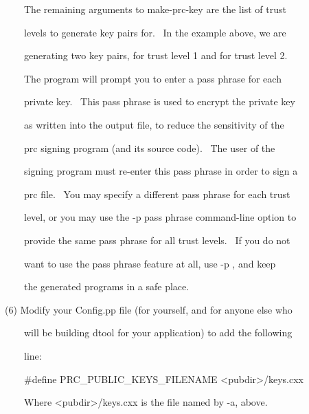 \documentclass[a4paper]{article}
\begin{document}
\bigskip

{\color{black}
\ \ \ \ The remaining arguments to make-prc-key are the list of trust}

{\color{black}
\ \ \ \ levels to generate key pairs for. \ In the example above, we are}

{\color{black}
\ \ \ \ generating two key pairs, for trust level 1 and for trust level 2.}


\bigskip

{\color{black}
\ \ \ \ The program will prompt you to enter a pass phrase for each}

{\color{black}
\ \ \ \ private key. \ This pass phrase is used to encrypt the private key}

{\color{black}
\ \ \ \ as written into the output file, to reduce the sensitivity of the}

{\color{black}
\ \ \ \ prc signing program (and its source code). \ The user of the}

{\color{black}
\ \ \ \ signing program must re-enter this pass phrase in order to sign a}

{\color{black}
\ \ \ \ prc file. \ You may specify a different pass phrase for each trust}

{\color{black}
\ \ \ \ level, or you may use the -p {\textquotedbl}pass phrase{\textquotedbl} command-line option to}

{\color{black}
\ \ \ \ provide the same pass phrase for all trust levels. \ If you do not}

{\color{black}
\ \ \ \ want to use the pass phrase feature at all, use -p {\textquotedbl}{\textquotedbl}, and keep}

{\color{black}
\ \ \ \ the generated programs in a safe place.}

\clearpage
\bigskip


\bigskip

{\color{black}
(6) Modify your Config.pp file (for yourself, and for anyone else who}

{\color{black}
\ \ \ \ will be building dtool for your application) to add the following}

{\color{black}
\ \ \ \ line:}


\bigskip

{\color{black}
\ \ \ \ \#define PRC\_PUBLIC\_KEYS\_FILENAME {\textless}pubdir{\textgreater}/keys.cxx}


\bigskip

{\color{black}
\ \ \ \ Where {\textless}pubdir{\textgreater}/keys.cxx is the file named by -a, above.}
\end{document}
